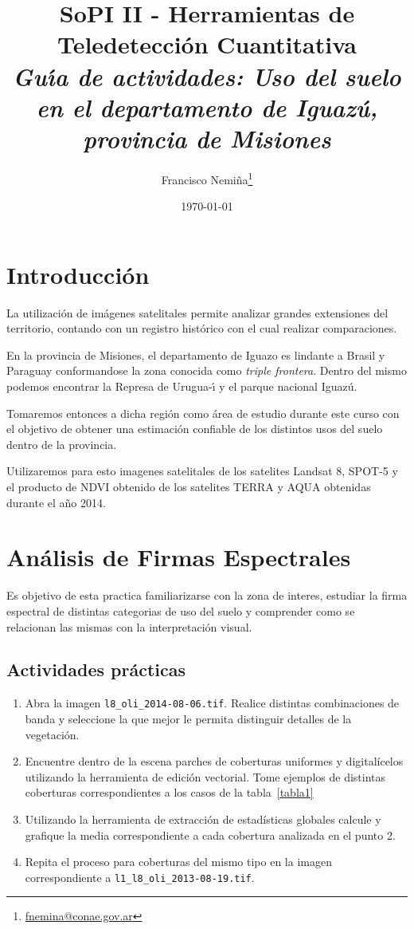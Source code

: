 \documentclass[hidelinks,12pt]{article}
\title{SoPI II - Herramientas de Teledetecci\'on Cuantitativa \\ 
\emph{Gu\'{\i}a de actividades: Uso del suelo en el departamento de Iguaz\'u,
provincia de Misiones}}
\author{Francisco
Nemi\~na\thanks{\href{mailto:fnemina@conae.govar}{fnemina@conae.gov.ar}}}
\affil{Unidad de Educaci\'on y Formaci\'on Masiva\\ 
    Comisi\'on Nacional de Actividades Espaciales}
\date{\today}
\begin{document}
\maketitle

\section*{Introducci\'on}

La utilización de imágenes satelitales permite analizar grandes extensiones del
territorio, contando con un registro histórico con el cual realizar
comparaciones.

En la provincia de Misiones, el departamento de Iguazo es lindante a Brasil y 
Paraguay conformandose la zona conocida como \emph{triple frontera}. Dentro del 
mismo podemos encontrar la Represa de Urugua-\'{\i} y el parque nacional
Iguaz\'u.

Tomaremos entonces a dicha regi\'on como \'area de estudio durante este curso
con el objetivo de obtener una estimaci\'on confiable de los distintos usos del
suelo dentro de la provincia.

Utilizaremos para esto imagenes satelitales de los satelites Landsat 8, SPOT-5 y
el producto de NDVI obtenido de los satelites TERRA y AQUA obtenidas durante el
a\~no 2014. 

\newpage
\section{Análisis de Firmas Espectrales}
Es objetivo de esta practica familiarizarse con la zona de interes, estudiar la
firma espectral de distintas categorias de uso del suelo y comprender como se
relacionan las mismas con la interpretaci\'on visual.

\subsection{Actividades pr\'acticas}
\begin{enumerate}
    \item Abra la imagen \texttt{l8\_oli\_2014-08-06.tif}. Realice distintas
        combinaciones de banda y seleccione la que mejor le permita distinguir 
        detalles de la vegetación.
    \item Encuentre dentro de la escena parches de coberturas uniformes y 
        digitalícelos utilizando la herramienta de edición vectorial. Tome
        ejemplos de distintas coberturas correspondientes a los casos de la
        tabla~\ref{tabla1}
    \item Utilizando la herramienta de extracción de estadísticas globales
        calcule y grafique la media correspondiente a cada cobertura analizada 
        en el punto 2.
    \item Repita el proceso para coberturas del mismo tipo en la imagen 
        correspondiente a \texttt{l1\_l8\_oli\_2013-08-19.tif}.
\end{enumerate}
\end{document}
